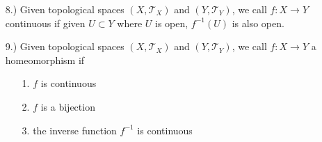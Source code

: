\documentclass[11pt]{article}
\begin{document}
\begin{itemize}
    \item [8.)] Given topological spaces $(X,\mathcal{T}_X)$ and $(Y,\mathcal{T}_Y)$, we call $f:X\to Y$ continuous if given $U\subset Y$ where $U$ is open, $f^{-1}(U)$ is also open.

    \item [9.)] Given topological spaces $(X,\mathcal{T}_X)$ and $(Y,\mathcal{T}_Y)$, we call $f:X\to Y$ a homeomorphism if
    \begin{itemize}
        \item [1.] $f$ is continuous

        \item [2.] $f$ is a bijection

        \item [3.] the inverse function $f^{-1}$ is continuous
    \end{itemize}
\end{itemize}
\end{document}
